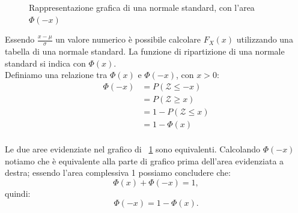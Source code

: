 \begin{figure}[ht]
\centering
{}
\caption{Rappresentazione grafica di una normale standard, con l'area $\Phi(-x)$}
\label{fig:gauss_phi}
\end{figure}

\noindent Essendo $\frac{x - \mu}{\sigma}$ un valore numerico è possibile calcolare $F_X(x)$ utilizzando una tabella di una normale standard.
La funzione di ripartizione di una normale standard si indica con $\Phi(x)$. \\ Definiamo una relazione tra $\Phi(x)$ e $\Phi(-x)$, con $x > 0$:
\begin{align*}
    \Phi(-x) &= P(\mathcal Z \leq -x) \\
    &= P(\mathcal Z \geq x) \\
    &= 1 - P(\mathcal Z \leq x) \\
    &= 1 - \Phi(x) \\
\end{align*}

\noindent Le due aree evidenziate nel grafico di \figurename \ \ref{fig:gauss_phi} sono equivalenti. 
Calcolando $\Phi(-x)$ notiamo che è equivalente alla parte di grafico prima dell'area evidenziata a destra; essendo l'area complessiva 1 possiamo concludere che:
\[
\Phi(x) + \Phi(-x) = 1,
\]
quindi: \[
\Phi(-x) = 1 - \Phi(x).
\]

